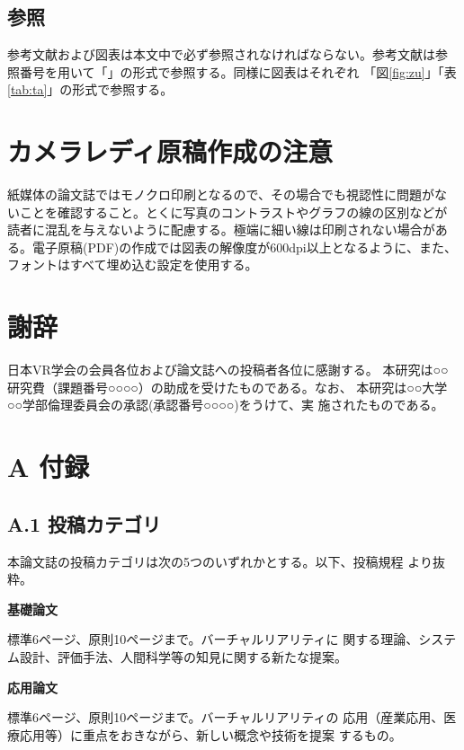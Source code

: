 \documentclass[a4paper,twoside]{jarticle}
\begin{document}
\subsection{参照}
参考文献および図表は本文中で必ず参照されなければならない。参考文献は参
照番号を用いて「\cite{bib1}」の形式で参照する。同様に図表はそれぞれ
「図\ref{fig:zu}」「表\ref{tab:ta}」の形式で参照する。

\section{カメラレディ原稿作成の注意}

紙媒体の論文誌ではモノクロ印刷となるので、その場合でも視認性に問題がな
いことを確認すること。とくに写真のコントラストやグラフの線の区別などが
読者に混乱を与えないように配慮する。極端に細い線は印刷されない場合があ
る。電子原稿(PDF)の作成では図表の解像度が600dpi以上となるように、また、
フォントはすべて埋め込む設定を使用する。

\section*{謝辞}
日本VR学会の会員各位および論文誌への投稿者各位に感謝する。
本研究は○○研究費（課題番号○○○○）の助成を受けたものである。なお、
本研究は○○大学○○学部倫理委員会の承認(承認番号○○○○)をうけて、実
施されたものである。


    

\section*{A 付録}
\subsection*{A.1 投稿カテゴリ}
本論文誌の投稿カテゴリは次の5つのいずれかとする。以下、投稿規程
\cite{toukou}より抜粋。

\noindent
{\bf 基礎論文}

標準6ページ、原則10ページまで。バーチャルリアリティに
関する理論、システム設計、評価手法、人間科学等の知見に関する新たな提案。 

\noindent
{\bf 応用論文}

標準6ページ、原則10ページまで。バーチャルリアリティの
応用（産業応用、医療応用等）に重点をおきながら、新しい概念や技術を提案
するもの。
\end{document}
